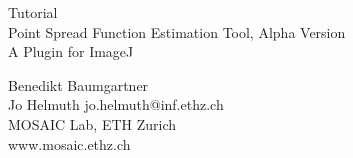 \documentclass[a4paper, 12pt]{article}
\begin{document}

\begin{titlepage}
\begin{center}
\Large{Tutorial\\}
{\Huge Point Spread Function Estimation Tool, Alpha Version\\\vspace{1cm}A Plugin for ImageJ\\}

\vspace{2cm}   
\begin{figure}[h]
\end{figure}
\vspace{2cm} 
\normalsize{Benedikt Baumgartner\\}%
\normalsize{Jo Helmuth \quad jo.helmuth@inf.ethz.ch\\}
\vspace{1cm}
\Large{MOSAIC Lab, ETH Zurich\\}
\normalsize{www.mosaic.ethz.ch}
\end{center}
\end{titlepage}


\end{document}

